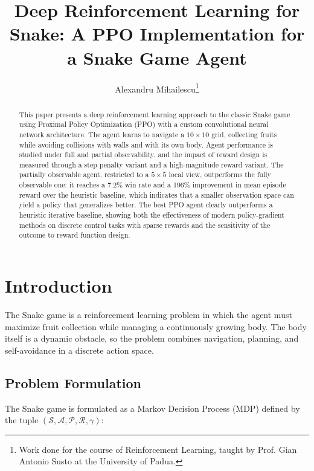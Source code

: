 \documentclass[10pt, conference, letterpaper]{IEEEtran}
\begin{document}
\title{Deep Reinforcement Learning for Snake: A PPO Implementation for a Snake Game Agent}
\IEEEoverridecommandlockouts
\author{Alexandru Mihailescu\thanks{Work done for the course of Reinforcement Learning, taught by Prof. Gian Antonio Susto at the University of Padua.}}

\maketitle

\begin{abstract}
This paper presents a deep reinforcement learning approach to the classic Snake game using Proximal Policy Optimization (PPO) with a custom convolutional neural network architecture. The agent learns to navigate a $10 \times 10$ grid, collecting fruits while avoiding collisions with walls and with its own body. Agent performance is studied under full and partial observability, and the impact of reward design is measured through a step penalty variant and a high-magnitude reward variant. The partially observable agent, restricted to a $5 \times 5$ local view, outperforms the fully observable one: it reaches a 7.2\% win rate and a 196\% improvement in mean episode reward over the heuristic baseline, which indicates that a smaller observation space can yield a policy that generalizes better. The best PPO agent clearly outperforms a heuristic iterative baseline, showing both the effectiveness of modern policy-gradient methods on discrete control tasks with sparse rewards and the sensitivity of the outcome to reward function design.
\end{abstract}

\section{Introduction}

The Snake game is a reinforcement learning problem in which the agent must maximize fruit collection while managing a continuously growing body. The body itself is a dynamic obstacle, so the problem combines navigation, planning, and self-avoidance in a discrete action space.

\subsection{Problem Formulation}

The Snake game is formulated as a Markov Decision Process (MDP) defined by the tuple $(\mathcal{S}, \mathcal{A}, \mathcal{P}, \mathcal{R}, \gamma)$:
\end{document}
